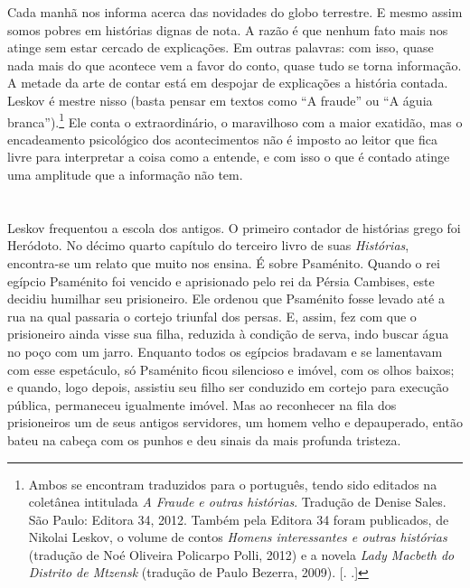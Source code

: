 Cada manhã nos informa acerca das novidades do globo terrestre. E mesmo
assim somos pobres em histórias dignas de nota. A razão é que nenhum
fato mais nos atinge sem estar cercado de explicações. Em outras
palavras: com isso, quase nada mais do que acontece vem a favor do
conto, quase tudo se torna informação. A metade da arte de contar está em
despojar de explicações a história contada\label{supra3}. Leskov é mestre nisso (basta
pensar em textos como ``A fraude'' ou ``A águia branca'').\footnote{Ambos
  se encontram traduzidos para o português, tendo sido editados na
  coletânea intitulada \emph{A Fraude e outras histórias}. Tradução de
  Denise Sales. São Paulo: Editora 34, 2012. Também pela Editora 34
  foram publicados, de Nikolai Leskov, o volume de contos \emph{Homens
  interessantes e outras histórias} (tradução de Noé Oliveira Policarpo
  Polli, 2012) e a novela \emph{Lady Macbeth do Distrito de Mtzensk}
  (tradução de Paulo Bezerra, 2009). [. .]} Ele
conta o extraordinário, o maravilhoso com a maior exatidão, mas o
encadeamento psicológico dos acontecimentos não é imposto ao leitor
que fica livre para interpretar a coisa como a entende, e com isso o
que é contado atinge uma amplitude que a informação não tem.

\section{}

Leskov frequentou a escola dos antigos. O primeiro contador de histórias
grego foi Heródoto. No décimo quarto capítulo do terceiro livro de suas
\emph{Histórias}, encontra-se um relato que muito nos ensina. É sobre
Psaménito. Quando o rei egípcio Psaménito foi vencido e aprisionado pelo
rei da Pérsia Cambises, este decidiu humilhar seu prisioneiro. Ele
ordenou que Psaménito fosse levado até a rua na qual passaria o cortejo
triunfal dos persas. E, assim, fez com que o prisioneiro ainda visse sua
filha, reduzida à condição de serva, indo buscar água no poço com um
jarro. Enquanto todos os egípcios bradavam e se lamentavam com esse
espetáculo, só Psaménito ficou silencioso e imóvel, com os olhos baixos;
e quando, logo depois, assistiu seu filho ser conduzido em cortejo para
execução pública, permaneceu igualmente imóvel. Mas ao reconhecer na
fila dos prisioneiros um de seus antigos servidores, um homem velho e
depauperado, então bateu na cabeça com os punhos e deu sinais da mais
profunda tristeza.

